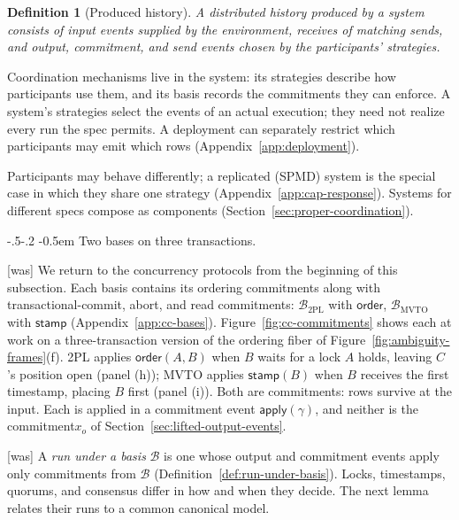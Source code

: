 \documentclass[sigconf]{cidr-2027}
\makeatletter
\newtheorem{definition}{Definition}
\theoremstyle{remark}
\renewcommand\paragraph{\@startsection{paragraph}{4}{\z@}%
  {-.5\baselineskip \@plus -2\p@ \@minus -.2\p@}%
  {-0.5em}%
  {\normalfont\bfseries}}
\newcommand{\commitment}{commitment\xspace}
\newcommand{\commitments}{commitments\xspace}
\makeatother
\begin{document}
\begin{definition}[Produced history]
\label{def:produced-history}
A distributed history \emph{produced} by a system consists of input events
supplied by the environment, receives of matching sends, and output,
\commitment, and send events chosen by the participants' strategies.
\end{definition}

Coordination mechanisms live in the system: its strategies describe how
participants use them, and its basis records the \commitments they can enforce.
A system's strategies select the events of an actual execution; they need not
realize every run the spec permits.  A deployment can separately restrict which
participants may emit which rows (Appendix~\ref{app:deployment}).

Participants may behave differently; a replicated (SPMD) system is the special
case in which they share one strategy (Appendix~\ref{app:cap-response}).
Systems for different specs compose as components
(Section~\ref{sec:proper-coordination}).

\paragraph{Two bases on three transactions.}


{\footnotesize\color{black!50}\noindent\textsf{[was]} We return to the concurrency protocols from the beginning of this
subsection.  Each basis contains its ordering \commitments along with
transactional-commit,
abort, and read \commitments: $\mathcal B_{\mathrm{2PL}}$ with $\mathsf{order}$,
$\mathcal B_{\mathrm{MVTO}}$ with $\mathsf{stamp}$
(Appendix~\ref{app:cc-bases}).  Figure~\ref{fig:cc-commitments} shows each
at work on a three-transaction version of the ordering fiber of
Figure~\ref{fig:ambiguity-frames}(f).  2PL applies $\mathsf{order}(A,B)$
when $B$ waits for a lock $A$ holds, leaving $C$'s position open (panel
(h)); MVTO applies $\mathsf{stamp}(B)$ when $B$ receives the first
timestamp, placing $B$ first (panel (i)).  Both are \commitments: rows survive
at the input.  Each is applied in a \commitment event
$\mathsf{apply}(\gamma)$, and neither is the \commitment $x_o$ of
Section~\ref{sec:lifted-output-events}.\par}



{\footnotesize\color{black!50}\noindent\textsf{[was]} A \emph{run under a basis} $\mathcal B$ is one whose output and
\commitment events apply only \commitments from $\mathcal B$
(Definition~\ref{def:run-under-basis}).  Locks, timestamps, quorums, and
consensus differ in how and when they decide.  The next lemma relates their
runs to a common canonical model.\par}
\end{document}
